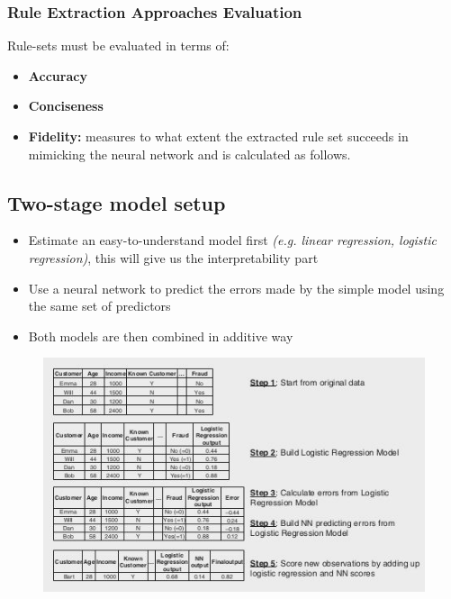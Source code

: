         \subsubsection{Rule Extraction Approaches Evaluation}
            Rule-sets must be evaluated in terms of:
            \begin{itemize}
                \item \textbf{Accuracy}
                \item \textbf{Conciseness}
                \item \textbf{Fidelity:} measures to what extent the extracted rule set succeeds in mimicking the neural network and is calculated as follows.
            \end{itemize}
    \subsection{Two-stage model setup}
        \begin{itemize}
            \item Estimate an easy-to-understand model first \textit{(e.g. linear regression, logistic regression)}, this will give us the interpretability part
            \item Use a neural network to predict the errors made by the simple model using the same set of predictors
            \item Both models are then combined in additive way
        \end{itemize}
        \begin{figure}[ht!]
            \centering 
            \includegraphics[width=0.6\linewidth]{lecture_15/twostage.png}
        \end{figure}
